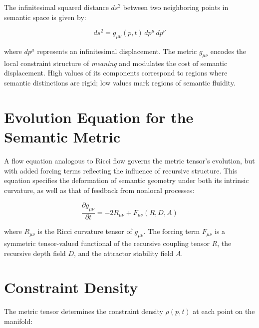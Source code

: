 The infinitesimal squared distance \(ds^2\) between two neighboring points in semantic space is given by:

\begin{equation}
ds^2 = g_{\mu\nu}(p, t) \, dp^\mu \, dp^\nu
\end{equation}

where \(dp^\mu\) represents an infinitesimal displacement. The metric \(g_{\mu\nu}\) encodes the local constraint structure of \textit{meaning} and modulates the cost of semantic displacement. High values of its components correspond to regions where semantic distinctions are rigid; low values mark regions of semantic fluidity.


\section{Evolution Equation for the Semantic Metric}
\label{3.3:evolution_equation_for_the_semantic_metric}

A flow equation analogous to Ricci flow \autocite{Hamilton1982, Perelman2002, RicciLeviCivita1901} governs the metric tensor's evolution, but with added forcing terms reflecting the influence of recursive structure. This equation specifies the deformation of semantic geometry under both its intrinsic curvature, as well as that of feedback from nonlocal processes:

\begin{equation}\label{eq:metric_evolution}
\frac{\partial g_{\mu\nu}}{\partial t} = -2 R_{\mu\nu} + F_{\mu\nu}(R, D, A)
\end{equation}

where \(R_{\mu\nu}\) is the Ricci curvature tensor of \(g_{\mu\nu}\). The forcing term \(F_{\mu\nu}\) is a symmetric tensor-valued functional of the recursive coupling tensor \(R\), the recursive depth field \(D\), and the attractor stability field \(A\).


\section{Constraint Density}
\label{3.4:constraint_density}

The metric tensor determines the constraint density \(\rho(p, t)\) at each point on the manifold:

